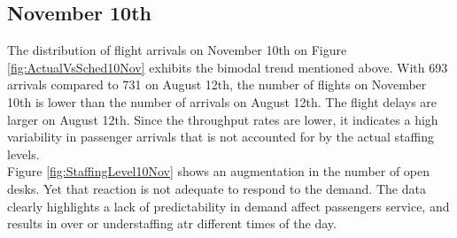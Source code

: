 \documentclass[11pt,onecolumn]{IEEEtran}
\begin{document}
\subsection{November 10th}
The distribution of flight arrivals on November 10th on Figure \ref{fig:ActualVsSched10Nov} exhibits the bimodal trend mentioned above. With 693 arrivals compared to 731 on August 12th, the number of flights on November 10th is lower than the number of arrivals on August 12th. The flight delays are larger on August 12th. Since the throughput rates are lower, it indicates a high variability in passenger arrivals that is not accounted for by the actual staffing levels.\\ 
Figure \ref{fig:StaffingLevel10Nov} shows an augmentation in the number of open desks. Yet that reaction is not adequate to respond to the demand. The data clearly highlights a lack of predictability in demand affect passengers service, and results in over or understaffing atr different times of the day.
\end{document}

